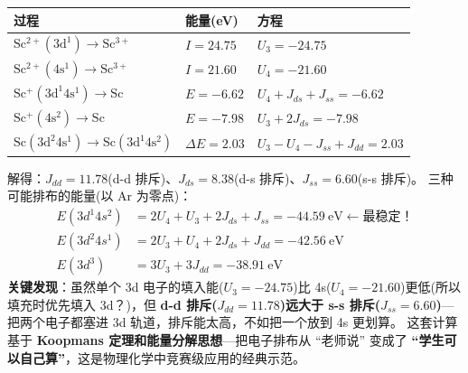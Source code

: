 {\def\LTcaptype{none} %
\begin{longtable}[]{@{}
  >{\raggedright\arraybackslash}p{}
  >{\centering\arraybackslash}p{}
  >{\raggedright\arraybackslash}p{}@{}}
\toprule\noalign{}
\begin{minipage}[b]{\linewidth}\raggedright
过程
\end{minipage} & \begin{minipage}[b]{\linewidth}\centering
能量(eV)
\end{minipage} & \begin{minipage}[b]{\linewidth}\raggedright
方程
\end{minipage} \\
\midrule\noalign{}
\endhead
\bottomrule\noalign{}
\endlastfoot
\(\mathrm{Sc^{2+}(3d^1) \rightarrow Sc^{3+}}\) & \(I = 24.75\) & \(U_3 = -24.75\) \\
\(\mathrm{Sc^{2+}(4s^1) \rightarrow Sc^{3+}}\) & \(I = 21.60\) & \(U_4 = -21.60\) \\
\(\mathrm{Sc^{+}(3d^1 4s^1) \rightarrow Sc}\) & \(E = -6.62\) & \(U_4 + J_{ds} + J_{ss} = -6.62\) \\
\(\mathrm{Sc^{+}(4s^2) \rightarrow Sc}\) & \(E = -7.98\) & \(U_3 + 2J_{ds} = -7.98\) \\
\(\mathrm{Sc(3d^2 4s^1) \rightarrow Sc(3d^1 4s^2)}\) & \(\Delta E = 2.03\) & \(U_3 - U_4 - J_{ss} + J_{dd} = 2.03\) \\
\end{longtable}
}

解得：\(J_{dd} = 11.78\)(d-d 排斥)、\(J_{ds} = 8.38\)(d-s 排斥)、\(J_{ss} = 6.60\)(s-s 排斥)。
三种可能排布的能量(以 Ar 为零点)：
\[\begin{aligned}
E(3d^1 4s^2) &= 2U_4 + U_3 + 2J_{ds} + J_{ss} = -44.59\ \mathrm{eV} \leftarrow \text{最稳定！}\\
E(3d^2 4s^1) &= 2U_3 + U_4 + 2J_{ds} + J_{dd} = -42.56\ \mathrm{eV}\\
E(3d^3)      &= 3U_3 + 3J_{dd} = -38.91\ \mathrm{eV}
\end{aligned}\]
\textbf{关键发现}：虽然单个 3d 电子的填入能(\(U_3 = -24.75\))比 4s(\(U_4 = -21.60\))更低(所以填充时优先填入 3d？)，但 \textbf{d-d 排斥(\(J_{dd} = 11.78\))远大于 s-s 排斥(\(J_{ss} = 6.60\))}---把两个电子都塞进 3d 轨道，排斥能太高，不如把一个放到 4s 更划算。
这套计算基于 \textbf{Koopmans 定理和能量分解思想}---把电子排布从 ``老师说'' 变成了 \textbf{``学生可以自己算''}，这是物理化学中竞赛级应用的经典示范。

